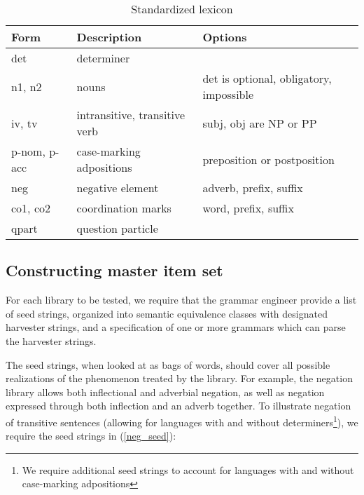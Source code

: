 \documentclass[11pt]{article}
\begin{document}
\begin{table*}[ht]
\begin{center}
\begin{tabular}{|l|l|l|}
\hline
Form & Description & Options \\ \hline \hline
det & determiner & \\ 
n1, n2 & nouns & det is optional, obligatory, impossible\\
iv, tv & intransitive, transitive verb & subj, obj are NP or PP\\
p-nom, p-acc & case-marking adpositions & preposition or postposition\\
neg & negative element & adverb, prefix, suffix\\
co1, co2 & coordination marks & word, prefix, suffix\\
qpart & question particle & \\
\hline
\end{tabular}
\end{center}
\caption{Standardized lexicon}
\label{tab1}
\end{table*}


\subsection{Constructing master item set}

For each library to be tested, we require that the grammar engineer
provide a list of seed strings, organized into semantic equivalence
classes with designated harvester strings, and a specification of one
or more grammars which can parse the harvester strings.

The seed strings, when looked at as bags of words, should cover all
possible realizations of the phenomenon treated by the library. For
example, the negation library allows both inflectional and adverbial
negation, as well as negation expressed through both inflection and an
adverb together.  To illustrate negation of transitive sentences
(allowing for languages with and without determiners\footnote{We
require additional seed strings to account for languages with and
without case-marking adpositions}), we require the seed strings in
(\ref{neg_seed}):
\end{document}
